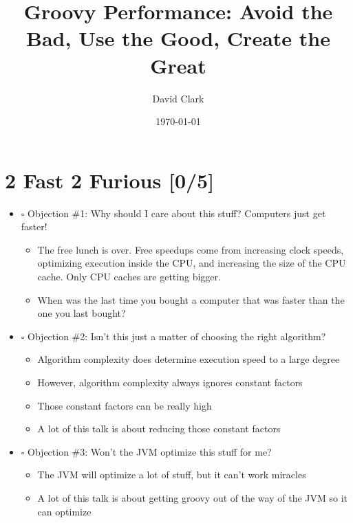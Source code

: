 \documentclass[11pt]{article}
\author{David Clark}
\date{\today}
\title{Groovy Performance: Avoid the Bad, Use the Good, Create the Great}
\begin{document}
\maketitle
\tableofcontents

\section{2 Fast 2 Furious [0/5]}
\label{sec:orgheadline1}

\begin{itemize}
\item $\square$ Objection \#1: Why should I care about this stuff? Computers just get faster!

\begin{itemize}
\item The free lunch is over. Free speedups come from increasing clock speeds, optimizing execution inside the CPU, and increasing the size of the CPU cache. Only CPU caches are getting bigger.

\item When was the last time you bought a computer that was faster than the one you last bought?
\end{itemize}

\item $\square$ Objection \#2: Isn't this just a matter of choosing the right algorithm?

\begin{itemize}
\item Algorithm complexity does determine execution speed to a large degree

\item However, algorithm complexity always ignores constant factors

\item Those constant factors can be really high

\item A lot of this talk is about reducing those constant factors
\end{itemize}

\item $\square$ Objection \#3: Won't the JVM optimize this stuff for me?

\begin{itemize}
\item The JVM will optimize a lot of stuff, but it can't work miracles

\item A lot of this talk is about getting groovy out of the way of the JVM so it can optimize


\end{itemize}
\end{itemize}
\end{document}
